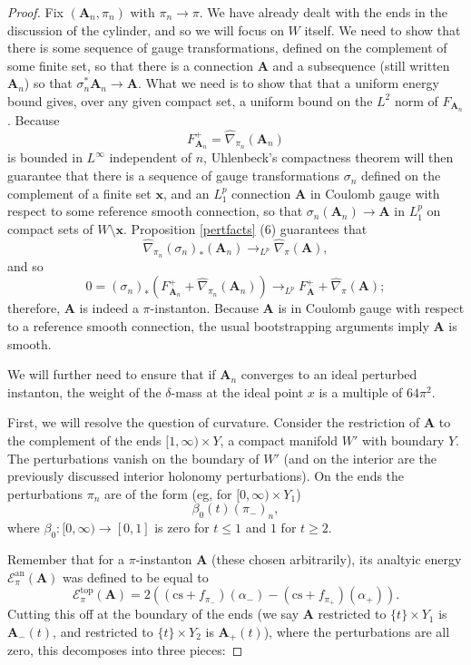 \documentclass[10pt,a4paper]{amsart}
\theoremstyle{definition}
\theoremstyle{remark}
\numberwithin{figure}{qchap}
\begin{document}
\begin{proof}Fix $(\mathbf{A}_n, \pi_n)$ with $\pi_n \to \pi$. We have already dealt with the ends in the discussion of the cylinder, and so we will focus on $W$ itself. We need to show that there is some sequence of gauge transformations, defined on the complement of some finite set, so that there is a connection $\mathbf{A}$ and a subsequence (still written $\mathbf{A}_n$) so that $\sigma_n^*\mathbf{A}_n \to \mathbf{A}$. What we need is to show that that a uniform energy bound gives, over any given compact set, a uniform bound on the $L^2$ norm of $F_{\mathbf{A}_n}$. Because $$F^+_{\mathbf{A}_n} = \widehat{\nabla}_{\pi_n}(\mathbf{A}_n)$$ is bounded in $L^\infty$ independent of $n$, Uhlenbeck's compactness theorem will then guarantee that there is a sequence of gauge transformations $\sigma_n$ defined on the complement of a finite set $\mathbf{x}$, and an $L^p_1$ connection $\mathbf{A}$ in Coulomb gauge with respect to some reference smooth connection, so that $\sigma_n(\mathbf{A}_n) \to \mathbf{A}$ in $L^p_1$ on compact sets of $W \setminus \mathbf{x}$. Proposition \ref{pertfacts} (6) guarantees that 
$$\widehat{\nabla}_{\pi_n}(\sigma_n)_*(\mathbf{A}_n) \to_{L^p} \widehat{\nabla}_\pi(\mathbf{A}),$$ 
and so 
$$0 = (\sigma_n)_*\left(F^+_{\mathbf{A}_n} + \widehat{\nabla}_{\pi_n}(\mathbf{A}_n)\right) \to_{L^p} F^+_{\mathbf{A}} + \widehat{\nabla}_\pi(\mathbf{A});$$ 
therefore, $\mathbf{A}$ is indeed a $\pi$-instanton. Because $\mathbf{A}$ is in Coulomb gauge with respect to a reference smooth connection, the usual bootstrapping arguments imply $\mathbf{A}$ is smooth.

We will further need to ensure that if $\mathbf{A}_n$ converges to an ideal perturbed instanton, the weight of the $\delta$-mass at the ideal point $x$ is a multiple of $64\pi^2$.

First, we will resolve the question of curvature. Consider the restriction of $\mathbf{A}$ to the complement of the ends $[1,\infty) \times Y$, a compact manifold $W'$ with boundary $Y$. The perturbations vanish on the boundary of $W'$ (and on the interior are the previously discussed interior holonomy perturbations). On the ends the perturbations $\pi_n$ are of the form (eg, for $[0,\infty) \times Y_1$) $$\beta_0(t) (\pi_-)_n,$$ where $\beta_0: [0,\infty) \to [0,1]$ is zero for $t \leq 1$ and $1$ for $t \geq 2$.

Remember that for a $\pi$-instanton $\mathbf{A}$ (these chosen arbitrarily), its analtyic energy $\mathcal E^{\text{an}}_\pi(\mathbf{A})$ was defined to be equal to $$\mathcal E^{\text{top}}_\pi(\mathbf{A}) = 2\left((\text{cs}+f_{\pi_-})(\alpha_-) - (\text{cs}+f_{\pi_+})(\alpha_+)\right).$$ Cutting this off at the boundary of the ends (we say $\mathbf{A}$ restricted to $\{t\} \times Y_1$ is $\mathbf{A}_-(t)$, and restricted to $\{t\} \times Y_2$ is $\mathbf{A}_+(t)$), where the perturbations are all zero, this decomposes into three pieces:


\end{proof}
\end{document}
